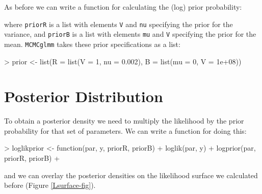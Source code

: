 \documentclass{article}
\begin{document}
As before we can write a function for calculating the (log) prior probability:

\begin{Schunk}
\end{Schunk}

where \texttt{priorR} is a list with elements \texttt{V} and \texttt{nu} specifying the prior for the variance, and \texttt{priorB} is a list with elements \texttt{mu} and \texttt{V} specifying the prior for the mean. \texttt{MCMCglmm} takes these prior specifications as a list: 

\begin{Schunk}
\begin{Sinput}
> prior <- list(R = list(V = 1, nu = 0.002), B = list(mu = 0, V = 1e+08))
\end{Sinput}
\end{Schunk}


\section{Posterior Distribution}

  To obtain a posterior density we need to multiply the likelihood by the prior probability for that set of parameters. We can write a function for doing this: 

\begin{Schunk}
\begin{Sinput}
> loglikprior <- function(par, y, priorR, priorB) {
+     loglik(par, y) + logprior(par, priorR, priorB)
+ }
\end{Sinput}
\end{Schunk}

and we can overlay the posterior densities on the likelihood surface we calculated before (Figure \ref{Lsurface-fig}).\\


\iftalk
\else
\fi
\end{document}
